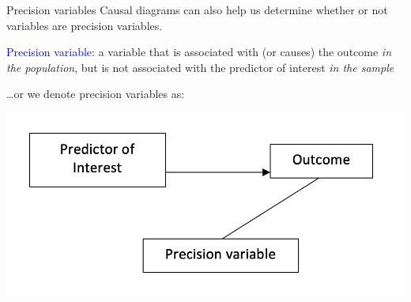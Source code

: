 \documentclass[10pt,t]{beamer}
\begin{document}
\begin{frame}{Precision variables}
Causal diagrams can also help us determine whether or not variables are precision variables.

\vspace{0.3cm}

\textcolor{blue}{Precision variable}: a variable that is associated with (or causes) the outcome \textit{in the population}, but is not associated with the predictor of interest \textit{in the sample} 

\vspace{0.3cm}

\dots or we denote precision variables as:

\vspace{0.3cm}

\centering \includegraphics[scale=0.4]{precvar2.png}
\end{frame}
\end{document}
